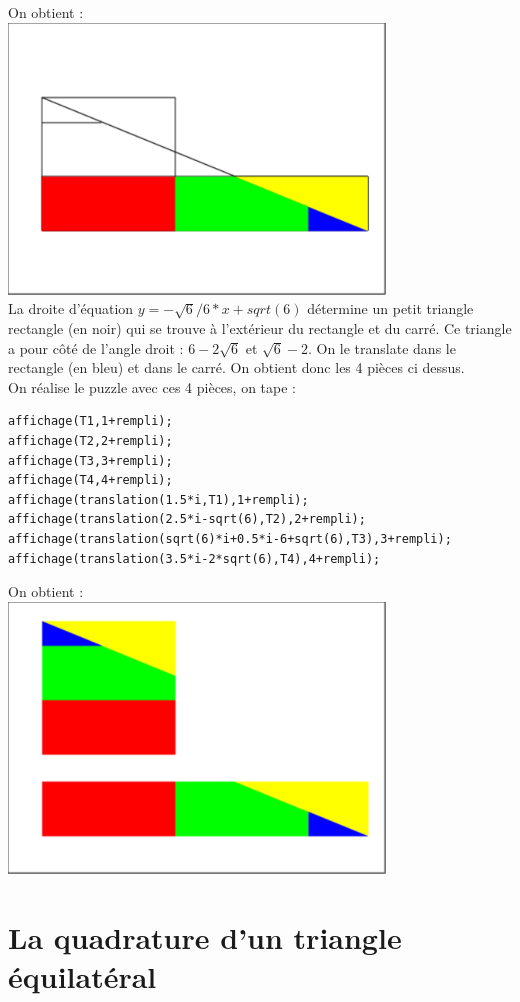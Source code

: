 \documentclass[a4paper,11pt]{book}
\begin{document}
On obtient :\\
\includegraphics[width=10cm]{carresqrt65}\\
La droite d'\'equation $y=-\sqrt 6/6*x+sqrt(6)$ d\'etermine un petit triangle 
rectangle (en noir) qui se trouve \`a l'ext\'erieur du rectangle et du carr\'e.
Ce triangle a pour c\^ot\'e de l'angle droit : $6-2\sqrt 6$ et $\sqrt 6-2$.
On le translate dans le rectangle (en bleu) et dans le carr\'e.
On obtient donc les 4 pi\`eces ci dessus.\\
On r\'ealise le puzzle avec ces 4 pi\`eces, on tape :
\begin{verbatim}
affichage(T1,1+rempli);
affichage(T2,2+rempli);
affichage(T3,3+rempli);
affichage(T4,4+rempli);
affichage(translation(1.5*i,T1),1+rempli);
affichage(translation(2.5*i-sqrt(6),T2),2+rempli);
affichage(translation(sqrt(6)*i+0.5*i-6+sqrt(6),T3),3+rempli);
affichage(translation(3.5*i-2*sqrt(6),T4),4+rempli);
\end{verbatim}
On obtient :\\
\includegraphics[width=10cm]{carresqrt66}
\section{La quadrature d'un triangle \'equilat\'eral}
\end{document}
